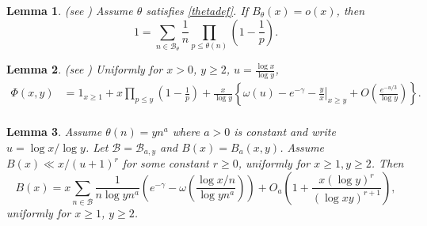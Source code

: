 \documentclass[11pt]{amsart}
\newtheorem{lemma}{Lemma}
\begin{document}
\begin{lemma}\label{Sum1}(see \cite[Theorem 1]{SPA})
Assume $\theta$ satisfies \eqref{thetadef}.
If $B_\theta(x)=o(x)$, then 
$$ 1=\sum_{n \in \mathcal{B}_\theta} \frac{1}{n} \prod_{p\le \theta(n)} \left(1-\frac{1}{p}\right).$$
\end{lemma}

\begin{lemma}\label{PhiLemma}(see \cite[Lemma 6]{OMG})
Uniformly for $x>0$, $y\ge 2$, $u=\frac{\log x}{\log y}$,
\begin{equation*}
\begin{split}
\Phi(x,y) &= 1_{x\ge 1}+ x \prod_{p\le y}\left(1-\frac{1}{p}\right)
+\frac{x}{\log y}\! \left\{\omega(u)-e^{-\gamma}\! -\left.\frac{y}{x}\right|_{x\ge y} 
+ O\left(\frac{e^{-u/3}}{\log y}\right)\! \right\}.\\
\end{split}
\end{equation*}
\end{lemma}


\begin{lemma}\label{LemFinalSum}
Assume $\theta(n) = y n^a$ where  $a>0$ is constant and write $u=\log x / \log y$. 
Let $\mathcal{B}=\mathcal{B}_{a,y}$ and $B(x)=B_a(x,y)$.
Assume $B(x) \ll x/ (u+1)^r$ for some constant $r\ge 0$, uniformly for $x\ge1, y\ge 2$. Then 
$$
B(x) = x\sum_{n\in \mathcal{B}}\frac{1}{n \log y n^a} \left( e^{-\gamma} - \omega\left(\frac{\log x/n}{\log y n^a}\right)\right)  
+O_a\left(1+ \frac{x (\log y)^r}{(\log xy)^{r+1}}\right),
$$
uniformly for $x\ge 1$, $y\ge 2$. 
\end{lemma}
\end{document}
